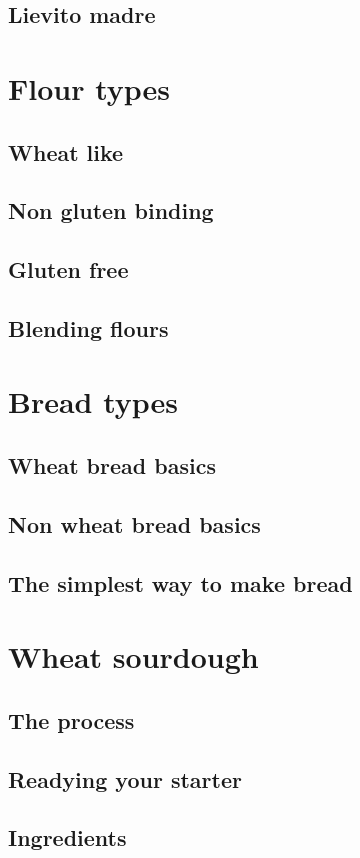 \documentclass[a4paper, 12pt]{book}
\begin{document}
\section{Lievito madre}

\chapter{Flour types}
\section{Wheat like}
\section{Non gluten binding}
\section{Gluten free}
\section{Blending flours}

\chapter{Bread types}
\section{Wheat bread basics}
\section{Non wheat bread basics}
\section{The simplest way to make bread}

\chapter{Wheat sourdough}
\section{The process}
\section{Readying your starter}
\section{Ingredients}
\end{document}
